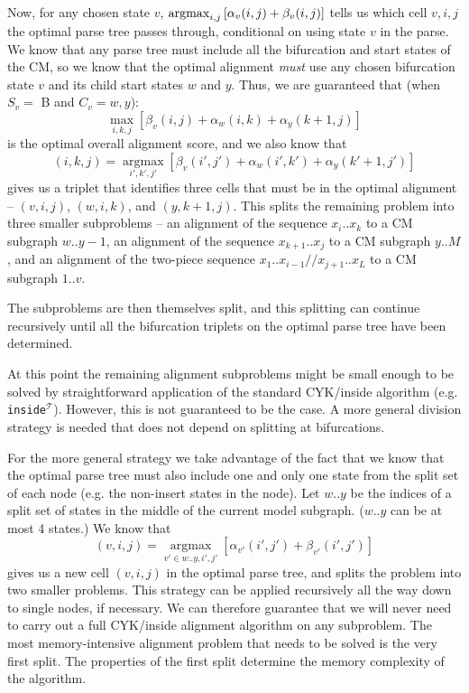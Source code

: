 \documentclass[11pt]{article}
\def\argmax{\mathop{\mathrm{argmax}}\limits}
\begin{document}
Now, for any chosen state $v$, $\argmax\nolimits_{i,j} \left[ \alpha_{v}(i,j) +
\beta_{v}(i,j) \right]$ tells us which cell $v,i,j$ the optimal parse tree
passes through, conditional on using state $v$ in the parse. We know
that any parse tree must include all the bifurcation and start states
of the CM, so we know that the optimal alignment \emph{must} use any
chosen bifurcation state $v$ and its child start states $w$ and
$y$. Thus, we are guaranteed that (when $S_v =$ B and $C_v = {w,y}$):
\[
   \max_{i,k,j} \left[ \beta_{v}(i,j) + \alpha_{w}(i,k) +
                       \alpha_{y}(k+1,j) \right]
\]
is the optimal overall alignment score, and we also know that
\[
      (i,k,j) = \argmax_{i',k',j'} \left[ \beta_{v}(i',j') +
      \alpha_{w}(i',k') + \alpha_{y}(k'+1,j')  \right]
\]
gives us a triplet that identifies three cells that must be in the
optimal alignment -- $(v,i,j)$, $(w,i,k)$, and $(y,k+1,j)$. This
splits the remaining problem into three smaller subproblems -- an
alignment of the sequence $x_{i}..x_{k}$ to a CM subgraph $w..y-1$, an
alignment of the sequence $x_{k+1}..x_{j}$ to a CM subgraph $y..M$,
and an alignment of the two-piece sequence
$x_1..x_{i-1}//x_{j+1}..x_L$ to a CM subgraph $1..v$.

The subproblems are then themselves split, and this splitting can
continue recursively until all the bifurcation triplets on the optimal
parse tree have been determined.

At this point the remaining alignment subproblems might be small
enough to be solved by straightforward application of the standard
CYK/inside algorithm (e.g. \texttt{inside}$^\mathcal{T}$). However,
this is not guaranteed to be the case. A more general division
strategy is needed that does not depend on splitting at bifurcations.

For the more general strategy we take advantage of the fact that we
know that the optimal parse tree must also include one and only one
state from the split set of each node (e.g. the non-insert states in
the node). Let $w..y$ be the indices of a split set of states in the
middle of the current model subgraph. ($w..y$ can be at most 4
states.)  We know that
\[
(v,i,j) = \argmax_{v' \in w..y,i',j'} \left[ \alpha_{v'}(i',j') +
\beta_{v'}(i',j') \right]
\]
gives us a new cell $(v,i,j)$ in the optimal parse tree, and splits
the problem into two smaller problems. This strategy can be applied
recursively all the way down to single nodes, if necessary. We can
therefore guarantee that we will never need to carry out a full
CYK/inside alignment algorithm on any subproblem. The most
memory-intensive alignment problem that needs to be solved is the very
first split.  The properties of the first split determine the memory
complexity of the algorithm.
\end{document}
